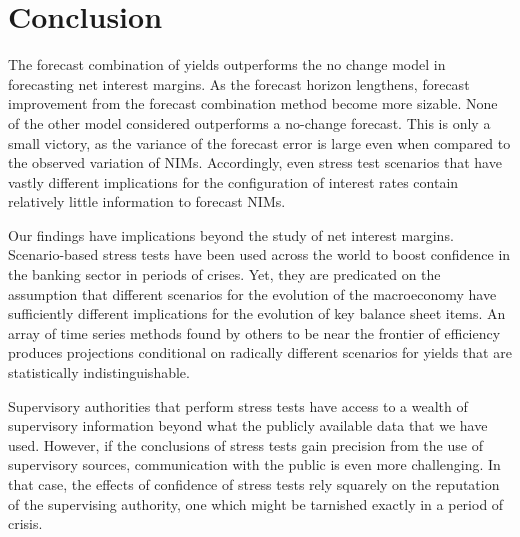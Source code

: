 \documentclass[11pt]{article}
\renewcommand{\baselinestretch}{1.5}
\begin{document}
\section{Conclusion}

The forecast combination of yields outperforms the no change model in forecasting net interest margins. As the forecast horizon lengthens, forecast improvement from the forecast combination method become more sizable. None of the other model considered outperforms a no-change forecast.  This is only a small victory, as the variance of the forecast error is large even when compared to the observed variation of NIMs. Accordingly, even stress test scenarios that have vastly different implications for the configuration of interest rates contain relatively little information to forecast NIMs.

Our findings have implications beyond the study of net interest margins. Scenario-based stress tests have been used across the world to boost confidence in the banking sector in periods of crises. Yet, they are predicated on the assumption that different scenarios for the evolution of the macroeconomy have sufficiently different implications for the evolution of key balance sheet items.  An array of time series methods found by others to be near the frontier of efficiency produces projections conditional on radically different scenarios for yields that are statistically indistinguishable. 

Supervisory authorities that perform stress tests have access to a wealth of supervisory information beyond what  the publicly available data that we have used. However, if the conclusions of stress tests gain precision from the use of supervisory sources, communication with the public is even more challenging. In that case, the effects of confidence of stress tests rely squarely on the reputation of the supervising authority, one which might be tarnished exactly in a period of crisis.

\normalsize \clearpage
\renewcommand{\baselinestretch}{1} 







\renewcommand{\baselinestretch}{1.5} \normalsize 
\end{document}
